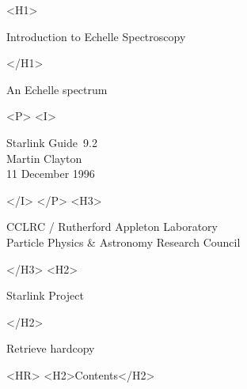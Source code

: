 \documentclass[twoside,11pt]{article}
\newcommand{\stardoccategory}  {Starlink Guide}
\newcommand{\stardocsource}    {sg\stardocnumber}
\newcommand{\stardocnumber}    {9.2}
\newcommand{\stardocauthors}   {Martin Clayton}
\newcommand{\stardocdate}      {11 December 1996}
\newcommand{\stardoctitle}     {Introduction to Echelle Spectroscopy}
\newcommand{\stardocversion}   {[software-version]}
\newcommand{\stardocmanual}    {[manual-type]}
\newcommand{\htmladdnormallink}[2]{#1}
\newcommand{\htmladdimg}[1]{}
\newcommand{\htmlref}[2]{#1}
\newcommand{\htmladdtonavigation}[1]{}
\newcommand{\xlabel}[1]{}
\newcommand{\latexonlytoc}[0]{\tableofcontents}
\begin{document}
\begin{htmlonly}
   \xlabel{}
   \begin{rawhtml} <H1> \end{rawhtml}
      \stardoctitle\\
   \begin{rawhtml} </H1> \end{rawhtml}

   \begin{figure}[h]
   \epsfysize=120mm
   \end{figure}

   \begin{center}
   An Echelle spectrum
   \end{center}


   \begin{rawhtml} <P> <I> \end{rawhtml}
   \stardoccategory\ \stardocnumber \\
   \stardocauthors \\
   \stardocdate
   \begin{rawhtml} </I> </P> <H3> \end{rawhtml}
      \htmladdnormallink{CCLRC}{http://www.cclrc.ac.uk} /
      \htmladdnormallink{Rutherford Appleton Laboratory}
                        {http://www.cclrc.ac.uk/ral} \\
      \htmladdnormallink{Particle Physics \& Astronomy Research Council}
                        {http://www.pparc.ac.uk} \\
   \begin{rawhtml} </H3> <H2> \end{rawhtml}
      \htmladdnormallink{Starlink Project}{http://star-www.rl.ac.uk/}
   \begin{rawhtml} </H2> \end{rawhtml}
   \htmladdnormallink{\htmladdimg{source.gif} Retrieve hardcopy}
      {http://star-www.rl.ac.uk/cgi-bin/hcserver?\stardocsource}\\

  \label{stardoccontents}
  \begin{rawhtml}
    <HR>
    <H2>Contents</H2>
  \end{rawhtml}
  \newcommand{\latexonlytoc}[0]{}
  \htmladdtonavigation{\htmlref{\htmladdimg{contents_motif.gif}}
        {stardoccontents}}


\end{htmlonly}
\end{document}
